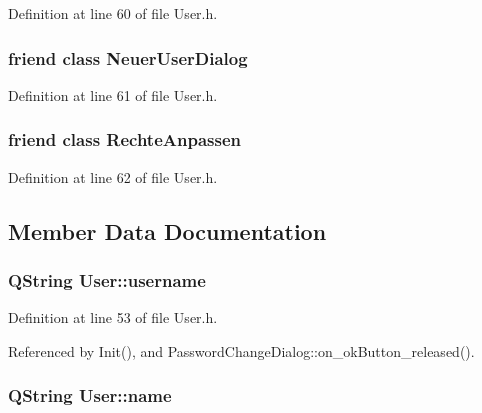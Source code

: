 Definition at line 60 of file User.h.\hypertarget{class_user_25239d16a03334074a70ce4f9301d56d}{
\subsubsection[NeuerUserDialog]{\setlength{\rightskip}{0pt plus 5cm}friend class {\bf NeuerUserDialog}}}
\label{class_user_25239d16a03334074a70ce4f9301d56d}




Definition at line 61 of file User.h.\hypertarget{class_user_3fffb2093eb859119c4d500dd91ae8cc}{
\subsubsection[RechteAnpassen]{\setlength{\rightskip}{0pt plus 5cm}friend class {\bf RechteAnpassen}}}
\label{class_user_3fffb2093eb859119c4d500dd91ae8cc}




Definition at line 62 of file User.h.

\subsection{Member Data Documentation}
\hypertarget{class_user_e4202de2b7974e92a55b913d20b03833}{
\subsubsection[username]{\setlength{\rightskip}{0pt plus 5cm}QString {\bf User::username}}}
\label{class_user_e4202de2b7974e92a55b913d20b03833}




Definition at line 53 of file User.h.

Referenced by Init(), and PasswordChangeDialog::on\_\-okButton\_\-released().\hypertarget{class_user_182c8e0056fab1df2af8318cc3f5c058}{
\subsubsection[name]{\setlength{\rightskip}{0pt plus 5cm}QString {\bf User::name}}}
\label{class_user_182c8e0056fab1df2af8318cc3f5c058}




